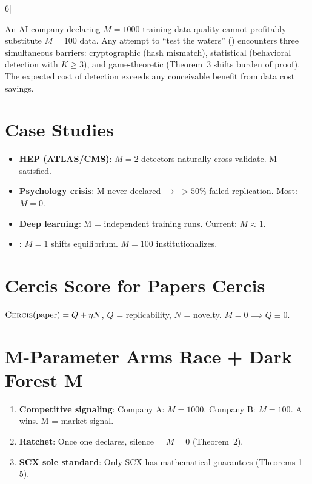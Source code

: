6|\documentclass[12pt,a4paper]{article}
\begin{document}
\begin{corollary}[]
An AI company declaring $M=1000$ training data quality cannot profitably substitute $M=100$ data. Any attempt to ``test the waters'' () encounters three simultaneous barriers: cryptographic (hash mismatch), statistical (behavioral detection with $K \ge 3$), and game-theoretic (Theorem~3 shifts burden of proof). The expected cost of detection exceeds any conceivable benefit from data cost savings.
\end{corollary}

\section{Case Studies }
\label{sec:cases}
\begin{itemize}[nosep]
    \item \textbf{HEP (ATLAS/CMS)}: $M=2$ detectors naturally cross-validate. M satisfied.
    \item \textbf{Psychology crisis}: M never declared $\to$ $>50\%$ failed replication. Most: $M=0$.
    \item \textbf{Deep learning}: M = independent training runs. Current: $M\approx 1$.
    \item \textbf{}: $M=1$ shifts equilibrium. $M=100$ institutionalizes.
\end{itemize}

\section{Cercis Score for Papers Cercis}
\label{sec:cercis}
$\textsc{Cercis}(\text{paper}) = Q + \eta N$, $Q$ = replicability, $N$ = novelty. $M=0 \implies Q \equiv 0$.

\section{M-Parameter Arms Race + Dark Forest M}
\label{sec:arms-race}
\begin{enumerate}[label=(\roman*)]
    \item \textbf{Competitive signaling}: Company A: $M=1000$. Company B: $M=100$. A wins. M = market signal.
    \item \textbf{Ratchet}: Once one declares, silence = $M=0$ (Theorem~2).
    \item \textbf{SCX sole standard}: Only SCX has mathematical guarantees (Theorems 1--5).
\end{enumerate}
\end{document}
